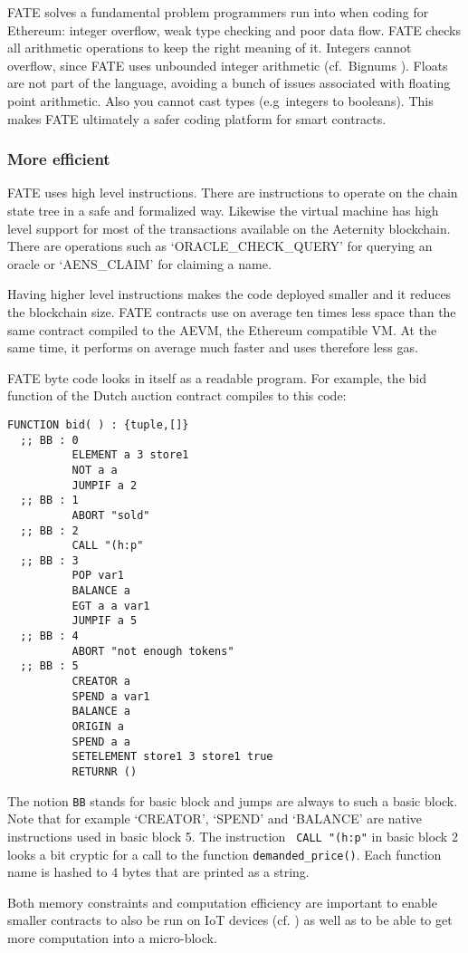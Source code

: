 FATE solves a fundamental problem programmers run into when coding for
Ethereum: integer overflow, weak type checking and poor data
flow. FATE checks all arithmetic operations to keep the right meaning
of it. Integers cannot overflow, since FATE uses unbounded integer
arithmetic (cf.\ Bignums \cite{serpette1989bignum}). Floats are not
part of the language, avoiding a bunch of issues associated with
floating point arithmetic. Also you cannot cast types (e.g\ integers to booleans). This makes
FATE ultimately a safer coding platform for smart contracts.

\subsubsection{More efficient}

FATE uses high level instructions. There are instructions to operate
on the chain state tree in a safe and formalized way. Likewise the
virtual machine has high level support for most of the transactions
available on the Aeternity blockchain. There are operations such as
`ORACLE\_CHECK\_QUERY' for querying an oracle or `AENS\_CLAIM' for
claiming a name.

Having higher level instructions makes the code
deployed smaller and it reduces the blockchain size. FATE contracts
use on average ten times less space than the same contract compiled to
the AEVM, the Ethereum compatible VM. At the same time, it performs on
average much faster and uses therefore less gas.

FATE byte code looks in itself as a readable program. For example,
the bid function of the Dutch auction contract compiles to
this code:

\begin{verbatim}
FUNCTION bid( ) : {tuple,[]}
  ;; BB : 0
          ELEMENT a 3 store1
          NOT a a
          JUMPIF a 2
  ;; BB : 1
          ABORT "sold"
  ;; BB : 2
          CALL "(h:p"
  ;; BB : 3
          POP var1
          BALANCE a
          EGT a a var1
          JUMPIF a 5
  ;; BB : 4
          ABORT "not enough tokens"
  ;; BB : 5
          CREATOR a
          SPEND a var1
          BALANCE a
          ORIGIN a
          SPEND a a
          SETELEMENT store1 3 store1 true
          RETURNR ()
\end{verbatim}

The notion \verb+BB+ stands for basic block and jumps are always to
such a basic block. Note that for example `CREATOR', `SPEND' and
`BALANCE' are native instructions used in basic block 5. The
instruction \verb+ CALL "(h:p"+ in basic block 2 looks a bit cryptic for a call to  the
function \verb+demanded_price()+. Each function name is hashed to 4
bytes that are printed as a string.

Both memory constraints and computation efficiency are important to
enable smaller contracts to also be run on IoT devices
(cf. \cite{ellul2018alkylvm}) as well as to be able to get more
computation into a micro-block.
